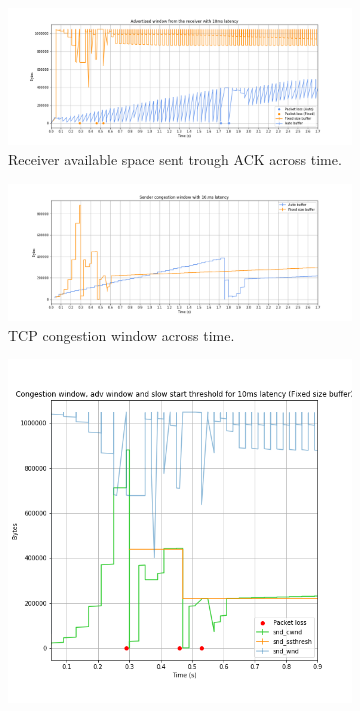 \documentclass[a4paper,10pt]{article}
\begin{document}
\begin{figure}[]
\begin{subfigure}{\textwidth}
    \centering
    \includegraphics[width=\textwidth]{images/10_wnd_comparison.png}
    \caption{Receiver available space sent trough ACK across time.}
    \label{fig:10ms_wnd}
\end{subfigure}%
\qquad
\begin{subfigure}{\textwidth}
   \centering
   \includegraphics[width=\textwidth]{images/10_cwnd_comparison.png}
    \caption{TCP congestion window across time.}
    \label{fig:10ms_cwnd}
\end{subfigure}
\qquad
\begin{subfigure}{0.5\textwidth}
   \centering
   \includegraphics[width=\textwidth]{images/10_detail_windows_fixed.png}

\end{subfigure}
\end{figure}
\end{document}
